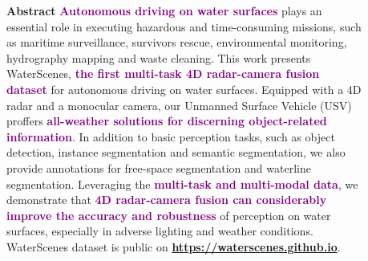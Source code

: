 \documentclass[final]{beamer}
\begin{document}
\begin{frame}[t]
\begin{columns}[t]
\begin{column}{0.53\paperwidth}
\begin{block}{\Large{\textbf{Abstract}}}
\large
\textcolor{purple}{\textbf{Autonomous driving on water surfaces}} plays an essential role in executing hazardous and time-consuming missions, such as maritime surveillance, survivors rescue, environmental monitoring, hydrography mapping and waste cleaning. 
This work presents WaterScenes, \textcolor{purple}{\textbf{the first multi-task 4D radar-camera fusion dataset}} for autonomous driving on water surfaces. Equipped with a 4D radar and a monocular camera, our Unmanned Surface Vehicle (USV) proffers \textcolor{purple}{\textbf{all-weather solutions for discerning object-related information}}. In addition to basic perception tasks, such as object detection, instance segmentation and semantic segmentation, we also provide annotations for free-space segmentation and waterline segmentation.
Leveraging the \textcolor{purple}{\textbf{multi-task and multi-modal data}}, we demonstrate that \textcolor{purple}{\textbf{4D radar-camera fusion can considerably improve the accuracy and robustness}} of perception on water surfaces, especially in adverse lighting and weather conditions.
WaterScenes dataset is public on \textcolor{purple}{\textbf{\url{https://waterscenes.github.io}}}.
\end{block}
\end{column}
\begin{column}{0.39\paperwidth}
\vspace{2cm}
\begin{figure}
\centering
\includegraphics[width=0.8\textwidth]{images/cat.jpeg}%
\caption{Sensor suite for our USV and coordinate system of each sensor.}
\end{figure}
\end{column}
\end{columns}


\end{frame}
\end{document}
